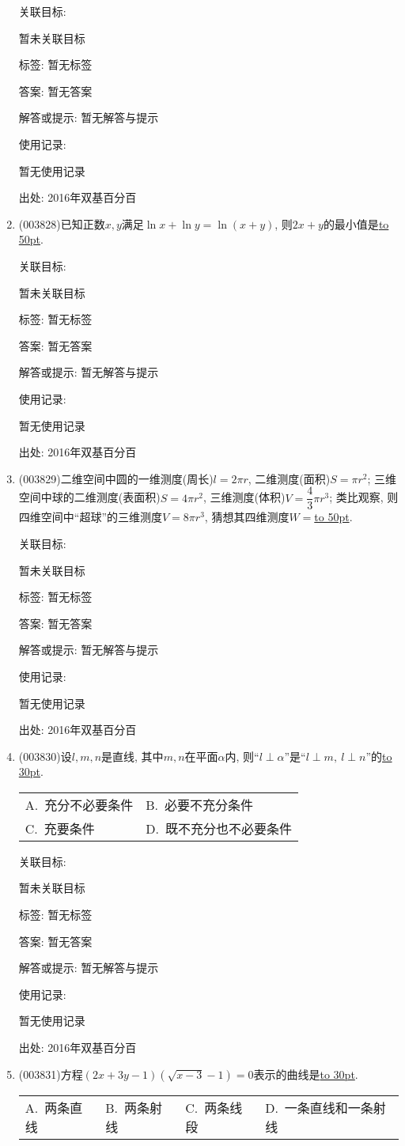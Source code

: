 \documentclass[10pt,a4paper]{article}
\newcommand{\blank}[1]{\underline{\hbox to #1pt{}}}
\newcommand{\twoch}[4]{\par\begin{tabular}{p{.46\textwidth}p{.46\textwidth}}
A.~#1& B.~#2\\
C.~#3& D.~#4
\end{tabular}}
\newcommand{\fourch}[4]{\par\begin{tabular}{p{.23\textwidth}p{.23\textwidth}p{.23\textwidth}p{.23\textwidth}}
A.~#1 &B.~#2& C.~#3& D.~#4
\end{tabular}}
\begin{document}
\begin{enumerate}[1.]
关联目标:

暂未关联目标



标签: 暂无标签

答案: 暂无答案

解答或提示: 暂无解答与提示

使用记录:

暂无使用记录


出处: 2016年双基百分百
\item { (003828)}已知正数$x,y$满足$\ln x+\ln y=\ln (x+y)$, 则$2x+y$的最小值是\blank{50}.


关联目标:

暂未关联目标



标签: 暂无标签

答案: 暂无答案

解答或提示: 暂无解答与提示

使用记录:

暂无使用记录


出处: 2016年双基百分百
\item { (003829)}二维空间中圆的一维测度(周长)$l=2\pi r$, 二维测度(面积)$S=\pi r^2$; 三维空间中球的二维测度(表面积)$S=4\pi r^2$, 三维测度(体积)$V=\dfrac 43\pi r^3$; 类比观察, 则四维空间中``超球''的三维测度$V=8\pi r^3$, 猜想其四维测度$W=$\blank{50}.


关联目标:

暂未关联目标



标签: 暂无标签

答案: 暂无答案

解答或提示: 暂无解答与提示

使用记录:

暂无使用记录


出处: 2016年双基百分百
\item { (003830)}设$l,m,n$是直线, 其中$m,n$在平面$\alpha$内, 则``$l\perp \alpha$''是``$l\perp m, \ l\perp n$''的\blank{30}.
\twoch{充分不必要条件}{必要不充分条件}{充要条件}{既不充分也不必要条件}


关联目标:

暂未关联目标



标签: 暂无标签

答案: 暂无答案

解答或提示: 暂无解答与提示

使用记录:

暂无使用记录


出处: 2016年双基百分百
\item { (003831)}方程$(2x+3y-1)(\sqrt{x-3}-1)=0$表示的曲线是\blank{30}.
\fourch{两条直线}{两条射线}{两条线段}{一条直线和一条射线}



\end{enumerate}
\end{document}
